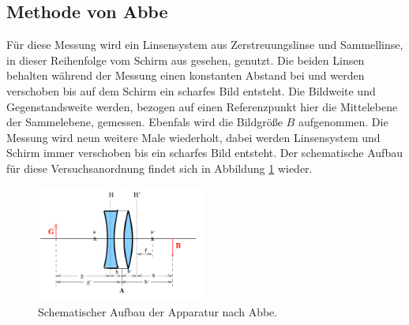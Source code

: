 \subsection{Methode von Abbe}
Für diese Messung wird ein Linsensystem aus Zerstreuungslinse und Sammellinse, in dieser Reihenfolge
vom Schirm aus gesehen, genutzt. Die beiden Linsen behalten während der Messung einen konstanten Abstand
bei und werden verschoben bis auf dem Schirm ein scharfes Bild entsteht. Die Bildweite und Gegenstandsweite
werden, bezogen auf einen Referenzpunkt hier die Mittelebene der Sammelebene, gemessen. Ebenfals wird die
Bildgröße $B$ aufgenommen. Die Messung wird neun weitere Male wiederholt, dabei werden Linsensystem und
Schirm immer verschoben bis ein scharfes Bild entsteht.
Der schematische Aufbau für diese Versuchsanordnung findet sich in Abbildung \ref{fig:Abbe} wieder.
\begin{figure}
 \centering
 \includegraphics[width=0.5\textwidth]{abbe.png}
 \caption{Schematischer Aufbau der Apparatur nach Abbe.\cite{sample}}
 \label{fig:Abbe}
 \end{figure}
